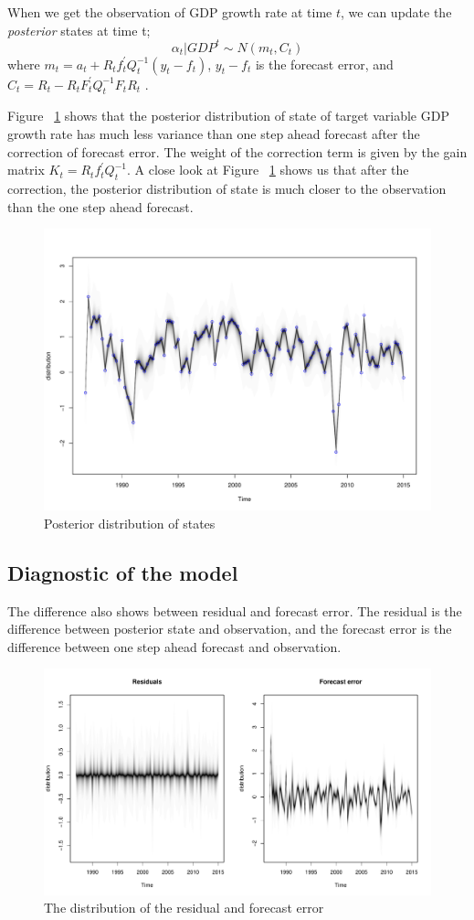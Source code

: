  

When we get the observation of GDP growth rate at time $t$, we can update the \textit{posterior} states at time t; 
$$ \alpha_t|GDP^t \sim N(m_t, C_t) $$ 
where $m_t =  a_t + R_t  f_t^\prime Q_t^{-1} (y_t - f_t)$, $y_t - f_t$ is the forecast error, and $C_t = R_t - R_t F_t^\prime Q_t^{-1} F_t R_t$ \cite{Petris2008}.


Figure  ~\ref{fig:states_distribution} shows that the posterior distribution of state of target variable GDP growth rate has much less variance than one step ahead forecast after the correction of forecast error. The weight of the correction term is given by the gain matrix $K_t = R_t  f_t^\prime Q_t^{-1}$. A close look at Figure  ~\ref{fig:states_distribution} shows us that after the correction, the posterior distribution of state is much closer to the observation than the one step ahead forecast. 




\begin{figure}[h]
\centering
\includegraphics[width=0.6\linewidth]{Figures/states_distribution}
\caption{Posterior distribution of states}
\label{fig:states_distribution}
\end{figure}




\subsection{Diagnostic of the model}

The difference also shows between residual and forecast error. The residual is the difference between posterior state and observation, and the forecast error is the difference between one step ahead forecast and observation. 


\begin{figure}[h]
	\centering
	\includegraphics[width=0.8\linewidth]{Figures/residuals_prediction_errors}
	\caption{The distribution of the residual and forecast error}
	\label{fig:residuals_prediction_errors}
\end{figure}

